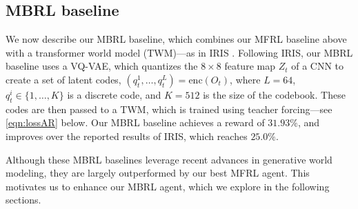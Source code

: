 

\subsection{MBRL baseline}
\label{sec:IRIS}
\label{sec:MBRLbaseline}

We now describe our MBRL baseline,
which combines our MFRL baseline above with a transformer world model (TWM)---as in
IRIS \citep{micheli2022transformers}. Following IRIS, our MBRL baseline uses a VQ-VAE, which quantizes the
$8 \times 8$ feature map $Z_t$ of a CNN
to create a set of latent codes,
$(q_t^1,\ldots,q_t^L) = \text{enc}(O_t)$,
where $L=64$, $q_t^i \in \{1,\ldots,K\}$
is a discrete code,
and $K=512$ is the size of the codebook.
These codes are then passed to a TWM, which is trained using
teacher forcing---see \cref{eqn:lossAR} below. 
Our MBRL baseline achieves a reward of $31.93\%$, and improves over the reported results of IRIS, which reaches $25.0\%$. 

Although these MBRL baselines leverage recent advances in generative world modeling, they are largely outperformed by our best MFRL agent. This motivates us to enhance our MBRL agent, which we explore in the following sections.



